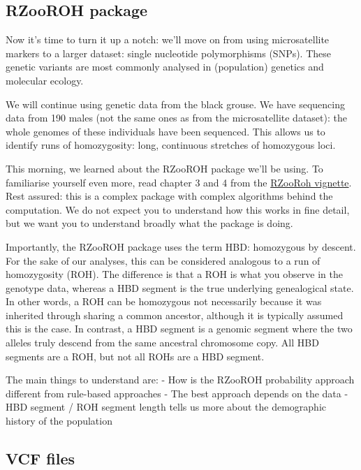 \documentclass[
  letterpaper,
  DIV=11,
  numbers=noendperiod]{scrreprt}
\begin{document}
\subsection{RZooROH package}\label{rzooroh-package}

Now it's time to turn it up a notch: we'll move on from using
microsatellite markers to a larger dataset: single nucleotide
polymorphisms (SNPs). These genetic variants are most commonly analysed
in (population) genetics and molecular ecology.

We will continue using genetic data from the black grouse. We have
sequencing data from 190 males (not the same ones as from the
microsatellite dataset): the whole genomes of these individuals have
been sequenced. This allows us to identify runs of homozygosity: long,
continuous stretches of homozygous loci.

This morning, we learned about the RZooROH package we'll be using. To
familiarise yourself even more, read chapter 3 and 4 from the
\href{https://cran.r-project.org/web/packages/RZooRoH/vignettes/zooroh-vignette.pdf}{RZooRoh
vignette}. Rest assured: this is a complex package with complex
algorithms behind the computation. We do not expect you to understand
how this works in fine detail, but we want you to understand broadly
what the package is doing.

Importantly, the RZooROH package uses the term HBD: homozygous by
descent. For the sake of our analyses, this can be considered analogous
to a run of homozygosity (ROH). The difference is that a ROH is what you
observe in the genotype data, whereas a HBD segment is the true
underlying genealogical state. In other words, a ROH can be homozygous
not necessarily because it was inherited through sharing a common
ancestor, although it is typically assumed this is the case. In
contrast, a HBD segment is a genomic segment where the two alleles truly
descend from the same ancestral chromosome copy. All HBD segments are a
ROH, but not all ROHs are a HBD segment.

The main things to understand are: - How is the RZooROH probability
approach different from rule-based approaches - The best approach
depends on the data - HBD segment / ROH segment length tells us more
about the demographic history of the population

\subsection{VCF files}\label{vcf-files}
\end{document}
